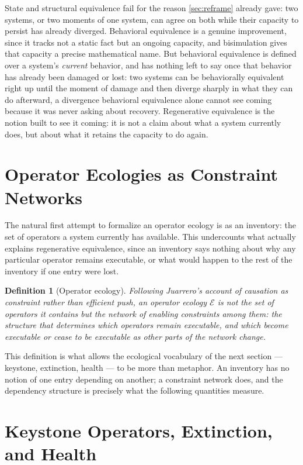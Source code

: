 \documentclass[12pt]{report}
\newtheorem{definition}{Definition}[section]
\begin{document}
State and structural equivalence fail for the reason \cref{sec:reframe}
already gave: two systems, or two moments of one system, can agree on
both while their capacity to persist has already diverged. Behavioral
equivalence is a genuine improvement, since it tracks not a static fact
but an ongoing capacity, and bisimulation gives that capacity a precise
mathematical name. But behavioral equivalence is defined over a system's
\emph{current} behavior, and has nothing left to say once that behavior
has already been damaged or lost: two systems can be behaviorally
equivalent right up until the moment of damage and then diverge sharply
in what they can do afterward, a divergence behavioral equivalence alone
cannot see coming because it was never asking about recovery. Regenerative
equivalence is the notion built to see it coming: it is not a claim about
what a system currently does, but about what it retains the capacity to
do again.

\section{Operator Ecologies as Constraint Networks}
\label{sec:constraints}

The natural first attempt to formalize an operator ecology is as an
inventory: the set of operators a system currently has available. This
undercounts what actually explains regenerative equivalence, since an
inventory says nothing about why any particular operator remains
executable, or what would happen to the rest of the inventory if one
entry were lost.

\begin{definition}[Operator ecology]
\label{def:operator-ecology}
Following Juarrero's account of causation as constraint rather than
efficient push, an \emph{operator ecology} $\mathcal{E}$ is not the set of
operators it contains but the network of enabling constraints among them:
the structure that determines which operators remain executable, and
which become executable or cease to be executable as other parts of the
network change.
\end{definition}

This definition is what allows the ecological vocabulary of the next
section --- keystone, extinction, health --- to be more than metaphor.
An inventory has no notion of one entry depending on another; a constraint
network does, and the dependency structure is precisely what the
following quantities measure.

\section{Keystone Operators, Extinction, and Health}
\label{sec:keystone}
\end{document}

